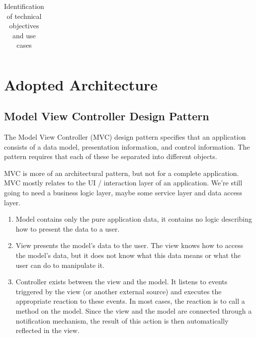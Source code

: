 \begin{longtable}{|m{10em}|m{10em}|m{10em}|}
      \caption{Identification of technical objectives and use cases}
      \label{tab:id_tech_objec_uc}
\end{longtable}





\section{Adopted Architecture}

\subsection{Model View Controller Design Pattern}

The Model View Controller (MVC) design pattern specifies that an application consists of a data model, presentation information, and control information. The pattern requires that each of these be separated into different objects.

MVC is more of an architectural pattern, but not for a complete application. MVC mostly relates to the UI / interaction layer of an application. We’re still going to need a business logic layer, maybe some service layer and data access layer.
\begin{enumerate}
      \item Model contains only the pure application data, it contains no logic describing how to present the data to a user.
      \item View presents the model’s data to the user. The view knows how to access the model’s data, but it does not know what this data means or what the user can do to manipulate it.
      \item Controller exists between the view and the model. It listens to events triggered by the view (or another external source) and executes the appropriate reaction to these events. In most cases, the reaction is to call a method on the model. Since the view and the model are connected through a notification mechanism, the result of this action is then automatically reflected in the view.
\end{enumerate}

